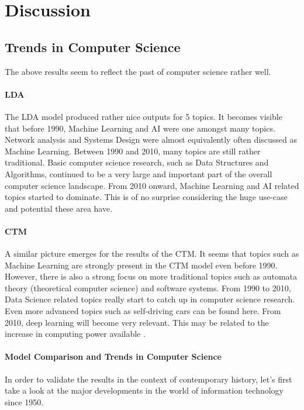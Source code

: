 \documentclass[fleqn,10pt]{SelfArx} %
\begin{document}
\section{Discussion}

\subsection{Trends in Computer Science}

The above results seem to reflect the past of computer science rather well.

\paragraph{LDA} The LDA model produced rather nice outputs for 5 topics. It becomes visible that before 1990, Machine Learning and AI were one amongst many topics. Network analysis and Systems Design were almost equivalently often discussed as Machine Learning. Between 1990 and 2010, many topics are still rather traditional. Basic computer science research, such as Data Structures and Algorithms, continued to be a very large and important part of the overall computer science landscape. From 2010 onward, Machine Learning and AI related topics started to dominate. This is of no surprise considering the huge use-case and potential these area have.

\paragraph{CTM} A similar picture emerges for the results of the CTM. It seems that topics such as Machine Learning are strongly present in the CTM model even before 1990. However, there is also a strong focus on more traditional topics such as automata theory (theoretical computer science) and software systems. From 1990 to 2010, Data Science related topics really start to catch up in computer science research. Even more advanced topics such as self-driving cars can be found here. From 2010, deep learning will become very relevant. This may be related to the increase in computing power available .

\paragraph{Model Comparison and Trends in Computer Science}
In order to validate the results in the context of contemporary history, let's first take a look at the major developments in the world of information technology since 1950.
\end{document}
